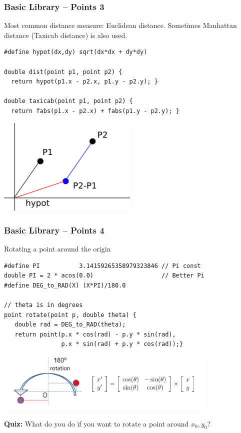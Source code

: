 \begin{frame}[fragile]
  \frametitle{Basic Library -- Points 3}
  {\smaller

    Most common distance measure: Euclidean distance. Sometimes
    Manhattan distance (Taxicab distance) is also used.

    \begin{exampleblock}{}
\begin{verbatim}
#define hypot(dx,dy) sqrt(dx*dx + dy*dy)

double dist(point p1, point p2) {
  return hypot(p1.x - p2.x, p1.y - p2.y); }

double taxicab(point p1, point p2) {
  return fabs(p1.x - p2.x) + fabs(p1.y - p2.y); }
\end{verbatim}
    \end{exampleblock}

    \begin{center}
      \includegraphics[width=0.5\textwidth]{../img/geom1}
    \end{center}
  }
\end{frame}

\begin{frame}[fragile]
  \frametitle{Basic Library -- Points 4}

  {\smaller

    \begin{exampleblock}{Rotating a point around the origin}
\begin{verbatim}
#define PI           3.14159265358979323846 // Pi const
double PI = 2 * acos(0.0)                   // Better Pi
#define DEG_to_RAD(X) (X*PI)/180.0

// theta is in degrees
point rotate(point p, double theta) {
   double rad = DEG_to_RAD(theta);
   return point(p.x * cos(rad) - p.y * sin(rad),
                p.x * sin(rad) + p.y * cos(rad));}
\end{verbatim}
    \end{exampleblock}
    \begin{center}
      \includegraphics[width=0.8\textwidth]{../img/rotation_halim}
    \end{center}

    {\bf Quiz:} What do you do if you want to rotate a point around $x_0, y_0$?
  }
\end{frame}

